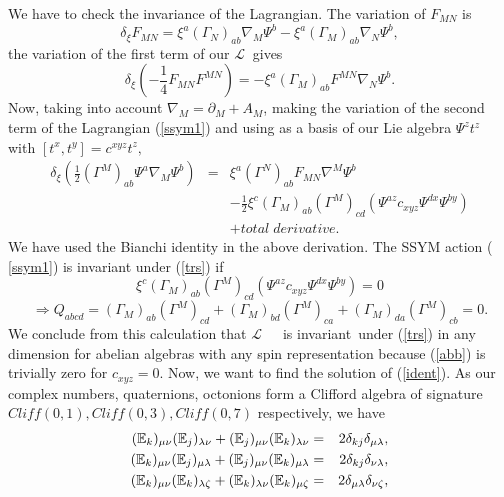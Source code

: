 \documentclass[a4paper,12pt]{book}
\begin{document}
We have to check the invariance of the Lagrangian. The variation of $F_{MN}$
is 
\begin{equation}
\delta _{\xi }F_{MN}=\xi ^{a}\left( \Gamma _{N}\right) _{ab}\nabla _{M}\Psi
^{b}-\xi ^{a}\left( \Gamma _{M}\right) _{ab}\nabla _{N}\Psi ^{b},
\end{equation}
the variation of the first term of our $\mathcal{L}$ $\ $gives 
\begin{equation}
\delta _{\xi }\left( -\frac{1}{4}F_{MN}F^{MN}\right) =-\xi ^{a}\left( \Gamma
_{M}\right) _{ab}F^{MN}\nabla _{N}\Psi ^{b}.
\end{equation}
Now, taking into account $\nabla _{M}=\partial _{M}+A_{M}$, making the
variation of the second term of the Lagrangian (\ref{ssym1}) and using as a
basis of our Lie algebra $\Psi ^{z}t^{z}$ with $\left[ t^{x},t^{y}\right]
=c^{xyz}t^{z},$%
\begin{eqnarray}
\delta _{\xi }\left( \frac{1}{2}\left( \Gamma ^{M}\right) _{ab}\Psi
^{a}\nabla _{M}\Psi ^{b}\right) &=&\xi ^{a}\left( \Gamma ^{N}\right)
_{ab}F_{MN}\nabla ^{M}\Psi ^{b}  \nonumber \\
&&-\frac{1}{2}\xi ^{c}\left( \Gamma _{M}\right) _{ab}\left( \Gamma
^{M}\right) _{cd}\left( \Psi ^{az}c_{xyz}\Psi ^{dx}\Psi ^{by}\right) 
\nonumber \\
&&+total\;derivative.
\end{eqnarray}
We have used the Bianchi identity in the above derivation. The SSYM action (%
\ref{ssym1}) is invariant under (\ref{trs}) if 
\begin{equation}
\xi ^{c}\left( \Gamma _{M}\right) _{ab}\left( \Gamma ^{M}\right) _{cd}\left(
\Psi ^{az}c_{xyz}\Psi ^{dx}\Psi ^{by}\right) =0  \label{abb}
\end{equation}
\begin{equation}
\Rightarrow Q_{abcd}=\left( \Gamma _{M}\right) _{ab}\left( \Gamma
^{M}\right) _{cd}+\left( \Gamma _{M}\right) _{bd}\left( \Gamma ^{M}\right)
_{ca}+\left( \Gamma _{M}\right) _{da}\left( \Gamma ^{M}\right) _{cb}=0.
\label{ident}
\end{equation}
We conclude from this calculation that $\mathcal{L}$\ \ \ is invariant\
under (\ref{trs}) in any dimension for abelian algebras with any spin
representation because (\ref{abb}) is trivially zero for $c_{xyz}=0$. Now,
we want to find the solution of (\ref{ident}). As our complex numbers,
quaternions, octonions form a Clifford algebra of signature $%
Cliff(0,1),Cliff\left( 0,3\right) ,Cliff\left( 0,7\right) $ respectively, we
have 
\begin{eqnarray}
(\Bbb{E}_{k})_{\mu \nu }(\Bbb{E}_{j})_{\lambda \nu }+(\Bbb{E}_{j})_{\mu \nu
}(\Bbb{E}_{k})_{\lambda \nu } &=&2\delta _{kj}\delta _{\mu \lambda }, 
\nonumber \\
(\Bbb{E}_{k})_{\mu \nu }(\Bbb{E}_{j})_{\mu \lambda }+(\Bbb{E}_{j})_{\mu \nu
}(\Bbb{E}_{k})_{\mu \lambda } &=&2\delta _{kj}\delta _{\nu \lambda }, 
\nonumber \\
(\Bbb{E}_{k})_{\mu \nu }(\Bbb{E}_{k})_{\lambda \zeta }+(\Bbb{E}%
_{k})_{\lambda \nu }(\Bbb{E}_{k})_{\mu \zeta } &=&2\delta _{\mu \lambda
}\delta _{\nu \zeta },  \label{trl}
\end{eqnarray}
\end{document}
